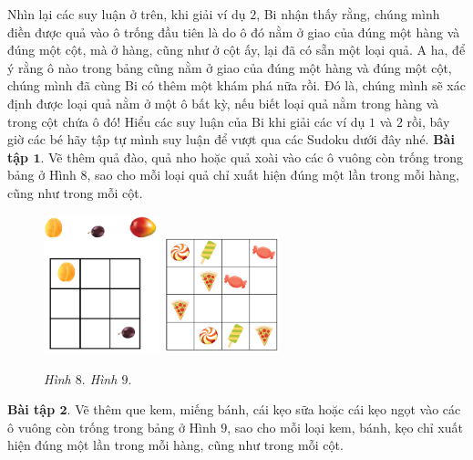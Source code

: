 	\vskip 0.1cm
	Nhìn lại các suy luận ở trên, khi giải ví dụ $2$, Bi nhận thấy rằng, chúng mình điền được quả vào ô trống đầu tiên là do ô đó nằm ở giao của đúng một hàng và đúng một cột, mà ở hàng, cũng như ở cột ấy, lại đã có sẵn một loại quả. A ha, để ý rằng ô nào trong bảng cũng nằm ở giao của đúng một hàng và đúng một cột, chúng mình đã cùng Bi có thêm một khám phá nữa rồi. Đó là, chúng mình sẽ xác định được loại quả nằm ở một ô bất kỳ, nếu biết loại quả nằm trong hàng và trong cột chứa ô đó!
	\vskip 0.1cm
	Hiểu các suy luận của Bi khi giải các ví dụ $1$ và $2$ rồi, bây giờ các bé hãy tập tự mình suy luận để vượt qua các Sudoku dưới đây nhé.
	\vskip 0.1cm
	\textbf{Bài tập $\pmb{1.}$} Vẽ thêm quả đào, quả nho hoặc quả xoài vào các ô vuông còn trống trong bảng ở Hình $8$, sao cho mỗi loại quả chỉ xuất hiện đúng một lần trong mỗi hàng, cũng như trong mỗi cột.
	\vskip 0.3cm
	\begin{figure}[H]
		\vspace*{-5pt}
		\centering
		\captionsetup{labelformat=empty, justification=centering}
		\includegraphics[width=0.30\textwidth]{hinh8}\hspace{40pt}
		\includegraphics[width=0.30\textwidth]{hinh10}

		\caption{\textit{\small Hình $8.$ \hspace*{100pt} Hình $9.$}} %
		\vspace*{-10pt}
	\end{figure}
	\textbf{Bài tập $\pmb{2.}$} Vẽ thêm que kem, miếng bánh, cái kẹo sữa hoặc cái kẹo ngọt vào các ô vuông còn trống trong bảng ở Hình $9$, sao cho mỗi loại kem, bánh, kẹo chỉ xuất hiện đúng một lần trong mỗi hàng, cũng như trong mỗi cột.
